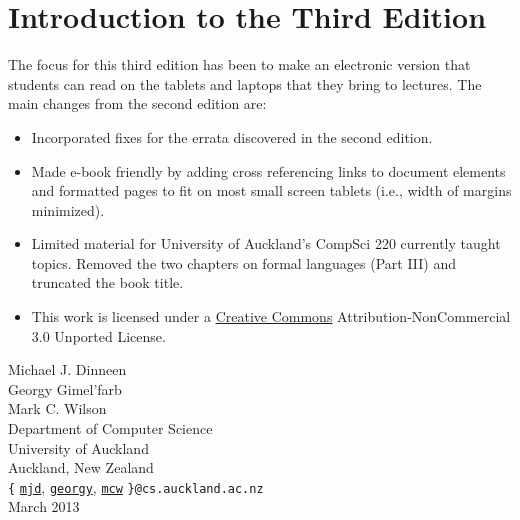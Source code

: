 \chapter*{Introduction to the Third Edition}

The focus for this third edition has been to make an electronic version that
students can read on the tablets and laptops that they bring to
lectures.  The main changes from the second edition are:

\begin{itemize}\setlength{\itemsep}{-1pt}
\item Incorporated fixes for the errata discovered in the second edition.
\item Made e-book friendly by adding cross referencing links to document 
elements and formatted pages to fit on most small screen tablets (i.e., width
of margins minimized).
\item Limited material for University of Auckland's CompSci 220
currently taught topics.
Removed the two chapters on formal languages (Part III) and
truncated the book title.
\item
This work is licensed under a
\href{http://creativecommons.org/licenses/by-nc/3.0/}{Creative
Commons} Attribution-NonCommercial 3.0 Unported License.

\end{itemize} 

\bigskip

\begin{flushright}
Michael J. Dinneen\\
Georgy Gimel'farb\\
Mark C. Wilson\\[2ex]

Department of Computer Science\\ 
University of Auckland\\
Auckland, New Zealand\\[2ex]

\verb|{|%
\href{mailto:mjd@cs.auckland.ac.nz?subject=DGW2013\_ebook}{\texttt{mjd}},
\href{mailto:georgy@cs.auckland.ac.nz?subject=DGW2013\_ebook}{\texttt{georgy}},
\href{mailto:mcw@cs.auckland.ac.nz?subject=DGW2013\_ebook}{\texttt{mcw}}%
\verb|}@cs.auckland.ac.nz|\\[2ex]

March 2013
\end{flushright}

